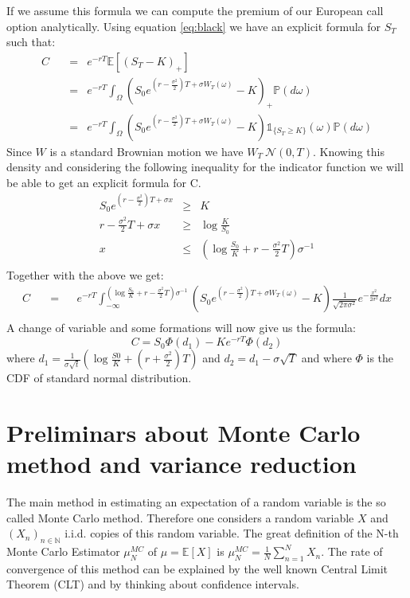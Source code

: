 \documentclass[12pt,a4paper]{scrartcl}
\begin{document}
If we assume this formula we can compute the premium of our European call option analytically. Using equation \ref{eq:black} we have an explicit formula for $S_T$ such that:
\begin{eqnarray*}
C \quad &=& e^{-rT} \mathbb{E} \left[ \left(S_T - K \right)_+ \right] \\
& = & e^{-rT} \int_\Omega \left(S_0 e^{ \left( r - \frac{\sigma^2}{2} \right)T + \sigma W_T(\omega) } - K \right)_+ \mathbb{P}(d\omega) \\
& = & e^{-rT}\int_\Omega \left(S_0 e^{ \left( r - \frac{\sigma^2}{2} \right)T + \sigma W_T(\omega) } - K \right) \mathds{1}_{ \lbrace S_T \geq K\rbrace }(\omega) \mathbb{P}(d\omega) 
\end{eqnarray*}
Since $W$ is a standard Brownian motion we have $W_T ~ \mathcal{N}(0,T)$. Knowing this density and considering the following inequality for the indicator function we will be able to get an explicit formula for C.
\begin{eqnarray*}
S_0 e^{ \left( r - \frac{\sigma^2}{2} \right)T + \sigma x } & \geq &  K \\
 r - \frac{\sigma^2}{2} T + \sigma x  & \geq & \log{\frac{K}{S_0}} \\
x  & \leq & \left( \log{\frac{S_0}{K}} +r - \frac{\sigma^2}{2}T \right) \sigma^{-1} \\
\end{eqnarray*}
Together with the above we get:
\begin{align*}
C \quad &=&& e^{-rT}\int_{- \infty}^{\left( \log{\frac{S_0}{K}} +r - \frac{\sigma^2}{2}T \right) \sigma^{-1} }
 \left(S_0 e^{ \left( r - \frac{\sigma^2}{2} \right)T + \sigma W_T(\omega) } - K \right) \frac{1}{\sqrt{2 \pi \sigma^2}} e^{-\frac{x^2}{2 \sigma^2}} dx\\
\end{align*}
A change of variable and some formations will now give us the formula:
\begin{equation}
\label{eq:expl}
C = S_0 \Phi(d_1) - K e^{-rT} \Phi(d_2) 
\end{equation}
where 
$d_1 = \frac{1}{\sigma \sqrt{t}}( \log{\frac{S0}{K}}+(r+\frac{\sigma^2}{2})T)$ and $ d_2 = d_1 - \sigma \sqrt{T}$ and where $\Phi$ is the CDF of standard normal distribution.

\section{Preliminars about Monte Carlo method and variance reduction}
The main method in estimating an expectation of a random variable is the so called Monte Carlo method. Therefore one considers a random variable $X$ and $(X_n)_{n \in \mathbb{N}}$ i.i.d. copies of this random variable. The great definition of the N-th Monte Carlo Estimator $\mu^{MC}_N$ of $\mu = \mathbb{E} \left[X \right]$ is $\mu^{MC}_N = \frac{1}{N} \sum_{n=1}^{N} X_n$. The rate of convergence of this method can be explained by the well known Central Limit Theorem (CLT) and by thinking about confidence intervals.
\end{document}

